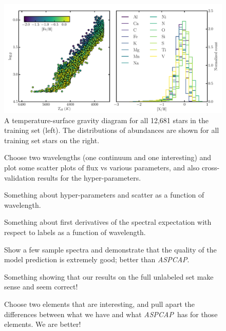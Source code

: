 \documentclass[12pt,preprint]{aastex}
\newcommand{\project}[1]{\textsl{#1}}
\newcommand{\acronym}[1]{{\small{#1}}}
\newcommand{\aspcap}{\project{\acronym{ASPCAP}}}
\begin{document}
\begin{figure}[p]
\includegraphics[width=\textwidth]{training_set_hrd.pdf}
\caption{A temperature-surface gravity diagram for all 12,681 stars in
the training set (left).  The distributions of abundances are shown for
all training set stars on the right.\label{fig:training_hrd}}
\end{figure}


\begin{figure}[p]
\caption{Choose two wavelengths (one continuum and one interesting)
  and plot some scatter plots of flux vs various parameters, and also
  cross-validation results for the
  hyper-parameters.\label{fig:onewavelength}}
\end{figure}

\begin{figure}[p]
\caption{Something about hyper-parameters and scatter as a function of
  wavelength.\label{fig:hyperpars}}
\end{figure}

\begin{figure}[p]
\caption{Something about first derivatives of the spectral expectation
  with respect to labels as a function of
  wavelength.\label{fig:derivatives}}
\end{figure}

\begin{figure}[p]
\caption{Show a few sample spectra and demonstrate that the quality of
  the model prediction is extremely good; better than
  \aspcap.\label{fig:correctness}}
\end{figure}

\begin{figure}[p]
\caption{Something showing that our results on the full unlabeled set
  make sense and seem correct!\label{fig:fulltest}}
\end{figure}


\begin{figure}[p]
\caption{Choose two elements that are interesting, and pull apart the
  differences between what we have and what \aspcap\ has for those
  elements.  We are better!\label{fig:elements}}
\end{figure}
\end{document}
